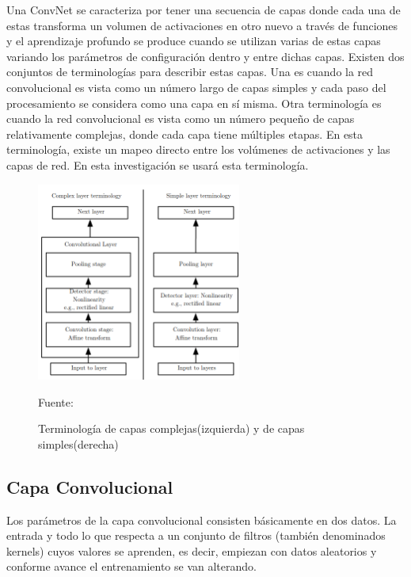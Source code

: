	Una ConvNet se caracteriza por tener una secuencia de capas donde cada una de estas transforma un volumen de activaciones en otro nuevo a través de funciones y el aprendizaje profundo se produce cuando se utilizan varias de estas capas variando los parámetros de configuración dentro y entre dichas capas. 
	\vskip 0.4cm  
	Existen dos conjuntos de terminologías para describir estas capas. Una es cuando la red convolucional es vista como un número largo de capas simples y cada paso del procesamiento se considera como una capa en sí misma. Otra terminología es cuando la red convolucional es vista como un número pequeño de capas relativamente complejas, donde cada capa tiene múltiples etapas. En esta terminología, existe un mapeo directo entre los volúmenes de activaciones y las capas de red. En esta investigación se usará esta terminología.

	
	\begin{figure}[H]
	\begin{center}
	\includegraphics[width=0.6\textwidth]{images/marcoteorico/types}
	\end{center}
	\begin{center}
	\caption{\small{Terminología de capas complejas(izquierda) y de capas simples(derecha)}}
	{\small{Fuente: \cite{Goodfellow-et-al-2016}}}
	\end{center}
	\vspace{-1.5em}
	\end{figure}
	
	\subsection{Capa Convolucional}

		Los parámetros de la capa convolucional consisten básicamente en dos datos. La entrada y todo lo que respecta a un conjunto de filtros (también denominados kernels) cuyos valores se aprenden, es decir, empiezan con datos aleatorios y conforme avance el entrenamiento se van alterando. 
		\vskip 0.3cm 
